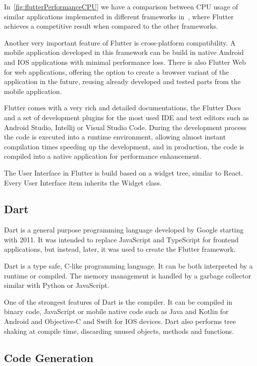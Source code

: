 \documentclass[a4paper,12pt]{report}
\begin{document}
In~\autoref{fig:flutterPerformanceCPU} we have a comparison between CPU usage
of similar applications implemented in different frameworks
in~\cite{flutterPerformance}, where Flutter achieves a competitive result when
compared to the other frameworks.

Another very important feature of Flutter is cross-platform compatibility. A
mobile application developed in this framework can be build in native Android
and IOS applications with minimal performance loss. There is also Flutter Web
for web applications, offering the option to create a browser variant of the
application in the future, reusing already developed and tested parts from the
mobile application.

Flutter comes with a very rich and detailed documentations, the Flutter
Docs\cite{flutterDocs} and a set of development plugins for the most used IDE
and text editors such as Android Studio, Intellij or Visual Studio Code. During
the development process the code is executed into a runtime environment,
allowing almost instant compilation times speeding up the development, and in
production, the code is compiled into a native application for performance
enhancement.

The User Interface in Flutter is build based on a widget tree, similar to
React. Every User Interface item inherits the Widget class.

\subsection{Dart}\label{chapter:dart}

Dart\cite{dartDocs} is a general purpose programming language developed by
Google starting with 2011. It was intended to replace JavaScript and TypeScript
for frontend applications, but instead, later, it was used to create the
Flutter framework.

Dart is a type safe, C-like programming language. It can be both interpreted by
a runtime or compiled. The memory management is handled by a garbage collector
similar with Python or JavaScript.

One of the strongest features of Dart is the compiler. It can be compiled in
binary code, JavaScript or mobile native code such as Java and Kotlin for
Android and Objective-C and Swift for IOS devices. Dart also performs tree
shaking at compile time, discarding unused objects, methods and functions.

\subsection{Code Generation}
\end{document}
